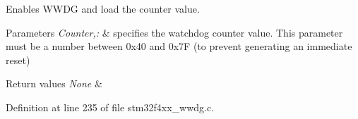 Enables W\-W\-D\-G and load the counter value. 


\begin{DoxyParams}{Parameters}
{\em Counter,\-:} & specifies the watchdog counter value. This parameter must be a number between 0x40 and 0x7\-F (to prevent generating an immediate reset) \\
\hline
\end{DoxyParams}

\begin{DoxyRetVals}{Return values}
{\em None} & \\
\hline
\end{DoxyRetVals}


Definition at line 235 of file stm32f4xx\-\_\-wwdg.\-c.

